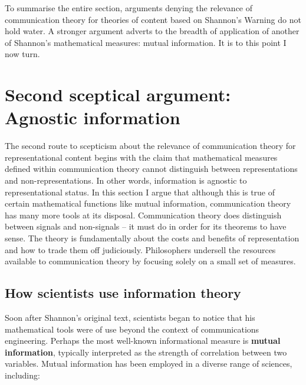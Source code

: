 \documentclass[12pt]{article}
\begin{document}


To summarise the entire section, arguments denying the relevance of communication theory for theories of content based on {\sc Shannon's Warning} do not hold water.
A stronger argument adverts to the breadth of application of another of Shannon's mathematical measures: mutual information.
It is to this point I now turn.


\section{Second sceptical argument: Agnostic information}\label{sec:agnostic}

The second route to scepticism about the relevance of communication theory for representational content begins with the claim that mathematical measures defined within communication theory cannot distinguish between representations and non-representations.
In other words, information is agnostic to representational status.
In this section I argue that although this is true of certain mathematical functions like mutual information, communication theory has many more tools at its disposal.
Communication theory does distinguish between signals and non-signals -- it must do in order for its theorems to have sense.
The theory is fundamentally about the costs and benefits of representation and how to trade them off judiciously.
Philosophers undersell the resources available to communication theory by focusing solely on a small set of measures.

\subsection{How scientists use information theory}\label{subsec:scientists}

Soon after Shannon's original text, scientists began to notice that his mathematical tools were of use beyond the context of communications engineering.
Perhaps the most well-known informational measure is \textbf{mutual information}, typically interpreted as the strength of correlation between two variables.
Mutual information has been employed in a diverse range of sciences, including:
\end{document}

